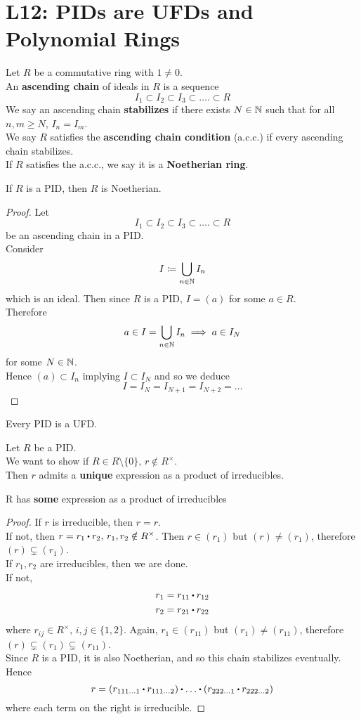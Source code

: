 \documentclass[../Main.tex]{subfiles}
\begin{document}
\chapter{L12: PIDs are UFDs and Polynomial Rings}
\begin{dfn}[title = {Ascending Chains, Noetherian Ring}]
	Let $R$ be a commutative ring with $1\ne 0$.\\
	An \textbf{ascending chain} of ideals in $R$ is a sequence
	\[I_1\subset I_2\subset I_3\subset\dots.\subset R\]
	We say an ascending chain \textbf{stabilizes} if there exists $N\in \mathbb{N}$ such that for all $n,m \ge N$, $I_n=I_m$.\\
	We say $R$ satisfies the \textbf{ascending chain condition} (a.c.c.) if every ascending chain stabilizes.\\
	If $R$ satisfies the a.c.c., we say it is a \textbf{Noetherian ring}.
\end{dfn}
\begin{thm}[title = PID is Noetherian]
	If $R$ is a PID, then $R$ is Noetherian.
\end{thm}
\begin{proof}
	Let
	\[I_1\subset I_2\subset I_3\subset\dots.\subset R\]
	be an ascending chain in a PID.\\
	Consider
	\[I\coloneqq \bigcup\limits_{n\in \mathbb{N}} I_n\]
	which is an ideal. Then since $R$ is a PID, $I=(a)$ for some $a\in R$.\\
	Therefore
	\[a\in I =\bigcup\limits_{n\in \mathbb{N}} I_n\implies a\in I_N \]
	for some $N\in \mathbb{N}$.\\
	Hence $(a)\subset I_n$ implying $I\subset I_N$ and so we deduce
	\[I=I_N=I_{N+1}=I_{N+2}=\dots\]
\end{proof}
\begin{thm}[title = PID IS UFD]
	Every PID is a UFD.
\end{thm}
Let $R$ be a PID.\\
We want to show if $R\in R\setminus \{0\},\, r\notin R^\times$.\\
Then $r$ admits a \textbf{unique} expression as a product of irreducibles.
\begin{lem}
	R has \textbf{some} expression as a product of irreducibles
\end{lem}
\begin{proof}
	If $r$ is irreducible, then $r=r$.\\
	If not, then $r=r_1\rdot r_2,\, r_1,r_2\notin R^\times$. Then $r\in (r_1)$ but $(r)\ne (r_1)$, therefore $(r)\subsetneq (r_1)$.\\
	If $r_1,r_2$ are irreducibles, then we are done.\\
	If not, 
	\begin{align*}
	r_1=r_{11}\rdot r_{12}\\
	r_2=r_{21}\rdot r_{22}
	\end{align*}
	where $r_{ij}\in R^\times,\, i,j\in \{1,2\}$. Again, $r_1\in (r_{11})$ but $(r_1)\ne (r_{11})$, therefore $(r)\subsetneq (r_1)\subsetneq (r_{11})$.\\
	Since $R$ is a PID, it is also Noetherian, and so this chain stabilizes eventually. Hence
	\[r=(r_{111\dots1}\rdot r_{111\dots 2})\rdot \dots \rdot (r_{222\dots1}\rdot r_{222\dots 2})\]
	where each term on the right is irreducible.
\end{proof}
\end{document}
